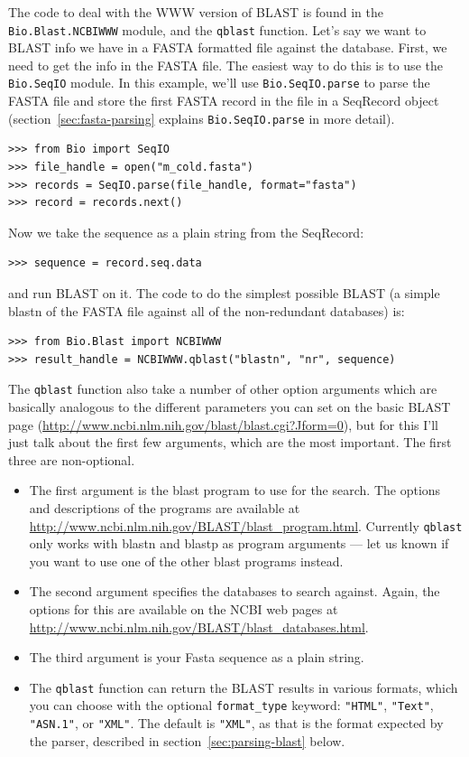 \documentclass{report}
\begin{document}
The code to deal with the WWW version of BLAST is found in the
\verb|Bio.Blast.NCBIWWW| module, and the \verb|qblast| function. Let's
say we want to BLAST info we have in a FASTA formatted file against
the database. First, we need to get the info in the FASTA file. The
easiest way to do this is to use the \verb|Bio.SeqIO| module.
In this example, we'll use \verb|Bio.SeqIO.parse| to parse the FASTA file
and store the first FASTA record in the file in a SeqRecord object
(section~\ref{sec:fasta-parsing} explains \verb|Bio.SeqIO.parse| in
more detail).


\begin{verbatim}
>>> from Bio import SeqIO
>>> file_handle = open("m_cold.fasta")
>>> records = SeqIO.parse(file_handle, format="fasta")
>>> record = records.next()
\end{verbatim}

Now we take the sequence as a plain string from the SeqRecord:
\begin{verbatim}
>>> sequence = record.seq.data
\end{verbatim}
and run BLAST on it. The code to do the simplest possible BLAST
(a simple blastn of the FASTA file against all of the non-redundant
databases) is:

\begin{verbatim}
>>> from Bio.Blast import NCBIWWW
>>> result_handle = NCBIWWW.qblast("blastn", "nr", sequence)
\end{verbatim}

The \verb|qblast| function also take a number of other option arguments
which are basically analogous to the different parameters you can set
on the basic BLAST page
(\url{http://www.ncbi.nlm.nih.gov/blast/blast.cgi?Jform=0}),
but for this I'll just talk about the first few arguments, which are
the most important. The first three are non-optional.

\begin{itemize}
\item The first argument is the blast program to use for the search. The
options and descriptions of the programs are available at
\url{http://www.ncbi.nlm.nih.gov/BLAST/blast_program.html}.
Currently \verb|qblast| only works with blastn and blastp as program
arguments --- let us known if you want to use one of the other blast
programs instead.
\item The second argument specifies the databases to search against. Again,
the options for this are available on the NCBI web pages at
\url{http://www.ncbi.nlm.nih.gov/BLAST/blast_databases.html}.
\item The third argument is your Fasta sequence as a plain string.
\item The \verb|qblast| function can return the BLAST results in various
formats, which you can choose with the optional \verb|format_type| keyword:
\verb|"HTML"|, \verb|"Text"|, \verb|"ASN.1"|, or \verb|"XML"|.
The default is \verb|"XML"|, as that is the format expected by the parser,
described in section~\ref{sec:parsing-blast} below.
\end{itemize}
\end{document}

